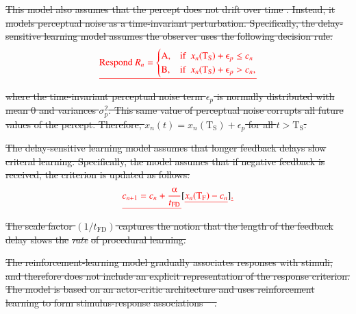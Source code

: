 \documentclass[doc, floatsintext]{apa7}
\providecommand{\DIFdel}[1]{{\protect\color{red}\sout{#1}}}                      %
\begin{document}
\DIFdel{This model also assumes that the percept does not drift over time . Instead, it models perceptual noise as a
time-invariant perturbation. Specifically, the
delay-sensitive learning model assumes the observer uses the
following decision rule:
}\begin{displaymath}
  \DIFdel{\text{Respond } R_n =
  \begin{cases}
    \text{A}, & \text{if ~} x_n(\text{T}_\text{S}) + \epsilon_p \leq c_n  \\
    \text{B}, & \text{if ~} x_n(\text{T}_\text{S}) + \epsilon_p > c_n,
  \end{cases}
}\end{displaymath}%
\DIFdel{where the time-invariant perceptual noise term $\epsilon_p$
is normally distributed with mean 0 and variances
$\sigma_p^2$. This same value of perceptual noise corrupts
all future values of the percept. Therefore, $x_n(t) =
x_n(\text{T}_\text{S}) + \epsilon_p$ for all $t >
\text{T}_\text{S}$.
}%

\DIFdel{The delay-sensitive learning model assumes that longer
feedback delays slow criteral learning. Specifically, the
model assumes that if negative feedback is received, the
criterion is updated as follows:
}\begin{displaymath}
  \DIFdel{c_{n+1} = c_n + \frac{\alpha}{t_\text{FD}} }[\DIFdel{x_n(\text{T}_\text{F}) - c_n}]\DIFdel{.
  \label{eq:DSL_learning}
}\end{displaymath}%
\DIFdel{The scale factor $(1/t_\text{FD})$ captures the notion that
the length of the feedback delay slows the }\textit{\DIFdel{rate}} %
\DIFdel{of
procedural learning.
}%

\DIFdel{The reinforcement-learning model gradually associates
responses with stimuli, and therefore does not include an
explicit representation of the response criterion. The model
is based on an actor-critic architecture and uses
reinforcement learning to form stimulus-response
associations \mbox{%
\parencite{SuttonBarto1998}}\hskip0pt%
.
}%
\end{document}
